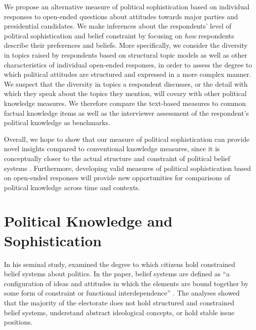 \documentclass[12pt]{article}
\begin{document}
We propose an alternative measure of political sophistication based on individual responses to open-ended questions about attitudes towards major parties and presidential candidates. We make inferences about the respondents' level of political sophistication and belief constraint by focusing on \textit{how} respondents describe their preferences and beliefs. More specifically, we consider the diversity in topics raised by respondents based on structural topic models \citep{roberts2014structural} as well as other characteristics of individual open-ended responses, in order to assess the degree to which political attitudes are structured and expressed in a more complex manner. We suspect that the diversity in topics a respondent discusses, or the detail with which they speak about the topics they mention, will covary with other political knowledge measures. We therefore compare the text-based measures to common factual knowledge items as well as the interviewer assessment of the respondent's political knowledge as benchmarks.

Overall, we hope to show that our measure of political sophistication can provide novel insights compared to conventional knowledge measures, since it is conceptually closer to the actual structure and constraint of political belief systems \citep[see for example][]{tetlock1983cognitive,luskin1987measuring}. Furthermore, developing valid measures of political sophistication based on open-ended responses will provide new opportunities for comparisons of political knowledge across time and contexts.


\section{Political Knowledge and Sophistication}

In his seminal study, \citet{converse1964nature} examined the degree to which citizens hold constrained belief systems about politics. In the paper, belief systems are defined as ``a configuration of ideas and attitudes in which the elements are bound together by some form of constraint or functional interdependence'' \citep[207]{converse1964nature}. The analyses showed that the majority of the electorate does not hold structured and constrained belief systems, understand abstract ideological concepts, or hold stable issue positions. 
\end{document}
